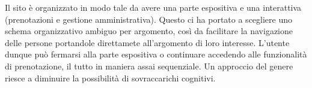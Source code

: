 Il sito è organizzato in modo tale da avere una parte espositiva e una interattiva (prenotazioni e gestione amministrativa).
Questo ci ha portato a scegliere uno schema organizzativo ambiguo per argomento, così da facilitare la navigazione delle persone
portandole direttamete all'argomento di loro interesse. L'utente dunque può fermarsi alla parte espositiva o continuare accedendo
alle funzionalità di prenotazione, il tutto in maniera assai sequenziale. Un approccio del genere riesce a diminuire la possibilità
di sovraccarichi cognitivi.
